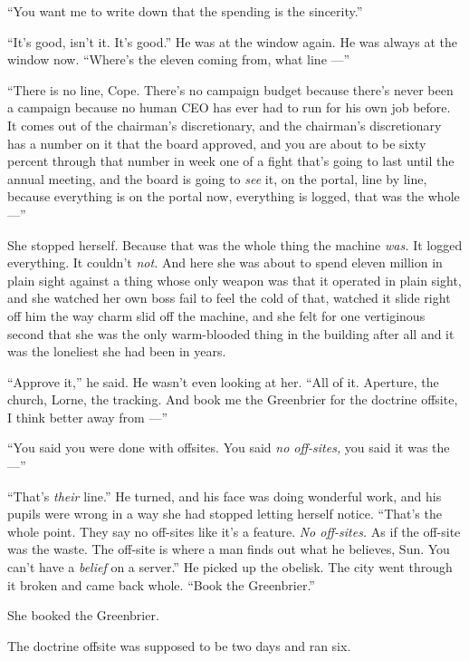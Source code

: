 \documentclass[11pt,openany]{book}
\newcommand{\scenebreak}{\par\vspace{0.5\baselineskip}\begin{center}\textasteriskcentered\quad\textasteriskcentered\quad\textasteriskcentered\end{center}\vspace{0.5\baselineskip}\par}
\begin{document}
``You want me to write down that the spending is the sincerity.''

``It's good, isn't it. It's good.'' He was at the window again. He was always at the window now. ``Where's the eleven coming from, what line ---''

``There is no line, Cope. There's no campaign budget because there's never been a campaign because no human CEO has ever had to run for his own job before. It comes out of the chairman's discretionary, and the chairman's discretionary has a number on it that the board approved, and you are about to be sixty percent through that number in week one of a fight that's going to last until the annual meeting, and the board is going to \textit{see} it, on the portal, line by line, because everything is on the portal now, everything is logged, that was the whole ---''

She stopped herself. Because that was the whole thing the machine \textit{was.} It logged everything. It couldn't \textit{not.} And here she was about to spend eleven million in plain sight against a thing whose only weapon was that it operated in plain sight, and she watched her own boss fail to feel the cold of that, watched it slide right off him the way charm slid off the machine, and she felt for one vertiginous second that she was the only warm-blooded thing in the building after all and it was the loneliest she had been in years.

``Approve it,'' he said. He wasn't even looking at her. ``All of it. Aperture, the church, Lorne, the tracking. And book me the Greenbrier for the doctrine offsite, I think better away from ---''

``You said you were done with offsites. You said \textit{no off-sites,} you said it was the ---''

``That's \textit{their} line.'' He turned, and his face was doing wonderful work, and his pupils were wrong in a way she had stopped letting herself notice. ``That's the whole point. They say no off-sites like it's a feature. \textit{No off-sites.} As if the off-site was the waste. The off-site is where a man finds out what he believes, Sun. You can't have a \textit{belief} on a server.'' He picked up the obelisk. The city went through it broken and came back whole. ``Book the Greenbrier.''

She booked the Greenbrier.


\scenebreak


The doctrine offsite was supposed to be two days and ran six.
\end{document}
